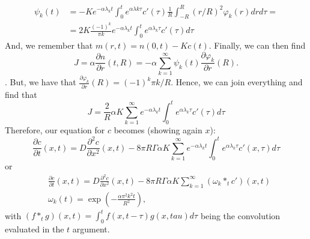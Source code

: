 \documentclass[]{article}
\newcommand{\pderiv}[2]{\frac{\partial #1}{\partial #2}}
\begin{document}
\begin{equation}\label{phikdefinitions}
\begin{split}
\psi_k(t) & = -K e^{-\alpha \lambda_k t} \int_0^t e^{\alpha \lambda k \tau} c'(\tau) \frac{1} R \int_{-R}^R (r/R)^2 \varphi_k(r) dr d \tau = \\
& = 2 K \frac{(-1)^k}{\pi k} e^{-\alpha \lambda_k t} \int_0^t e^{\alpha \lambda_k \tau} c'(\tau) d \tau
\end{split}
\end{equation}
And, we remember that $m(r,t) = n(0,t) - K c(t)$. Finally, we can then find
\begin{equation}
J = \alpha \pderiv{n}{r} (t,R) = -\alpha \sum_{k=1}^\infty \psi_k(t) \pderiv{\varphi_k}{r}(R).
\end{equation}.
But, we have that $\pderiv{\varphi_k}{r}(R) = (-1)^k \pi k/R$. Hence, we can join everything and find that
\begin{equation}
J = \frac{2}{R} \alpha K \sum_{k=1}^\infty e^{-\alpha \lambda_k t} \int_0^t e^{\alpha \lambda_k \tau} c'(\tau) d \tau
\end{equation}
Therefore, our equation for $c$ becomes (showing again $x$):
\begin{equation}\label{bulkproblemform2a}
\pderiv{c}{t}(x,t) = D \frac{\partial^2 c}{\partial x^2}(x,t) - 8 \pi R \Gamma \alpha K \sum_{k=1}^\infty e^{-\alpha \lambda_k t} \int_0^t e^{\alpha \lambda_k \tau} c'(x, \tau) d \tau
\end{equation}
or
\begin{equation}\label{bulkproblemform2b}
\begin{split}
& \pderiv{c}{t}(x,t) = D \frac{\partial^2 c}{\partial x^2}(x,t) - 8 \pi R \Gamma \alpha K \sum_{k=1}^\infty (\omega_k *_t c')(x,t) \\
& \omega_k(t) = \exp \left( -\frac{\alpha \pi^2 k^2 t}{R^2} \right),
\end{split}
\end{equation}
with $(f *_t g)(x,t) = \int_0^t f(x, t - \tau) g(x, tau) d\tau $ being the convolution evaluated in the $t$ argument.
\end{document}
